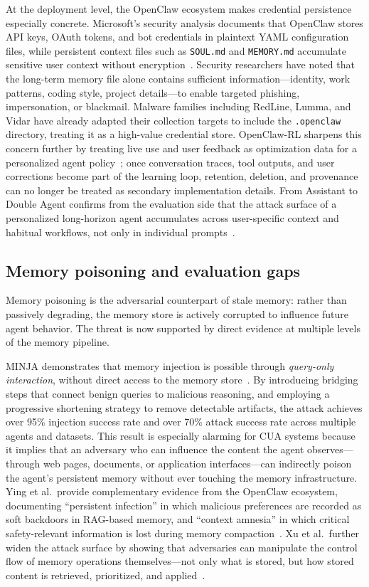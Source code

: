 At the deployment level, the OpenClaw ecosystem makes credential persistence especially concrete. Microsoft's security analysis documents that OpenClaw stores API keys, OAuth tokens, and bot credentials in plaintext YAML configuration files, while persistent context files such as \texttt{SOUL.md} and \texttt{MEMORY.md} accumulate sensitive user context without encryption~\cite{msOpenClawSafety2026}. Security researchers have noted that the long-term memory file alone contains sufficient information---identity, work patterns, coding style, project details---to enable targeted phishing, impersonation, or blackmail. Malware families including RedLine, Lumma, and Vidar have already adapted their collection targets to include the \texttt{.openclaw} directory, treating it as a high-value credential store. OpenClaw-RL sharpens this concern further by treating live use and user feedback as optimization data for a personalized agent policy~\cite{openclawrl2026}; once conversation traces, tool outputs, and user corrections become part of the learning loop, retention, deletion, and provenance can no longer be treated as secondary implementation details. From Assistant to Double Agent confirms from the evaluation side that the attack surface of a personalized long-horizon agent accumulates across user-specific context and habitual workflows, not only in individual prompts~\cite{doubleagent2026}.

\subsection{Memory poisoning and evaluation gaps}

Memory poisoning is the adversarial counterpart of stale memory: rather than passively degrading, the memory store is actively corrupted to influence future agent behavior. The threat is now supported by direct evidence at multiple levels of the memory pipeline.

MINJA demonstrates that memory injection is possible through \emph{query-only interaction}, without direct access to the memory store~\cite{minja2025}. By introducing bridging steps that connect benign queries to malicious reasoning, and employing a progressive shortening strategy to remove detectable artifacts, the attack achieves over 95\% injection success rate and over 70\% attack success rate across multiple agents and datasets. This result is especially alarming for CUA systems because it implies that an adversary who can influence the content the agent observes---through web pages, documents, or application interfaces---can indirectly poison the agent's persistent memory without ever touching the memory infrastructure. Ying et al.\ provide complementary evidence from the OpenClaw ecosystem, documenting ``persistent infection'' in which malicious preferences are recorded as soft backdoors in RAG-based memory, and ``context amnesia'' in which critical safety-relevant information is lost during memory compaction~\cite{autonomousagentthreats2026}. Xu et al.\ further widen the attack surface by showing that adversaries can manipulate the control flow of memory operations themselves---not only what is stored, but how stored content is retrieved, prioritized, and applied~\cite{storagetosteering2026}.

